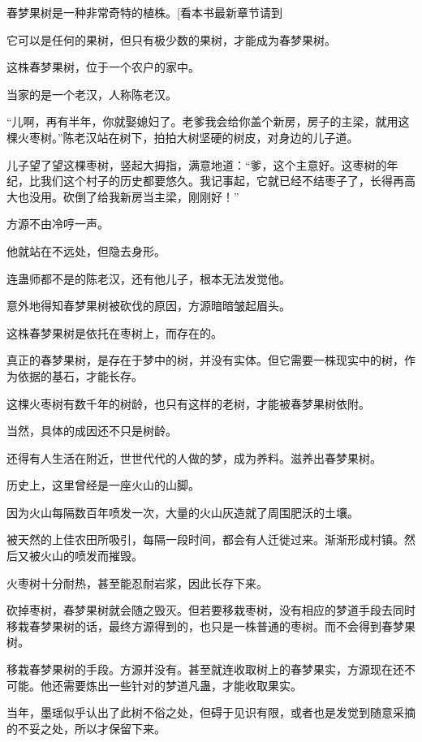 
\begin{this_body}

春梦果树是一种非常奇特的植株。[看本书最新章节请到

它可以是任何的果树，但只有极少数的果树，才能成为春梦果树。

这株春梦果树，位于一个农户的家中。

当家的是一个老汉，人称陈老汉。

“儿啊，再有半年，你就娶媳妇了。老爹我会给你盖个新房，房子的主梁，就用这棵火枣树。”陈老汉站在树下，拍拍大树坚硬的树皮，对身边的儿子道。

儿子望了望这棵枣树，竖起大拇指，满意地道：“爹，这个主意好。这枣树的年纪，比我们这个村子的历史都要悠久。我记事起，它就已经不结枣子了，长得再高大也没用。砍倒了给我新房当主梁，刚刚好！”

方源不由冷哼一声。

他就站在不远处，但隐去身形。

连蛊师都不是的陈老汉，还有他儿子，根本无法发觉他。

意外地得知春梦果树被砍伐的原因，方源暗暗皱起眉头。

这株春梦果树是依托在枣树上，而存在的。

真正的春梦果树，是存在于梦中的树，并没有实体。但它需要一株现实中的树，作为依据的基石，才能长存。

这棵火枣树有数千年的树龄，也只有这样的老树，才能被春梦果树依附。

当然，具体的成因还不只是树龄。

还得有人生活在附近，世世代代的人做的梦，成为养料。滋养出春梦果树。

历史上，这里曾经是一座火山的山脚。

因为火山每隔数百年喷发一次，大量的火山灰造就了周围肥沃的土壤。

被天然的上佳农田所吸引，每隔一段时间，都会有人迁徙过来。渐渐形成村镇。然后又被火山的喷发而摧毁。

火枣树十分耐热，甚至能忍耐岩浆，因此长存下来。

砍掉枣树，春梦果树就会随之毁灭。但若要移栽枣树，没有相应的梦道手段去同时移栽春梦果树的话，最终方源得到的，也只是一株普通的枣树。而不会得到春梦果树。

移栽春梦果树的手段。方源并没有。甚至就连收取树上的春梦果实，方源现在还不可能。他还需要炼出一些针对的梦道凡蛊，才能收取果实。

当年，墨瑶似乎认出了此树不俗之处，但碍于见识有限，或者也是发觉到随意采摘的不妥之处，所以才保留下来。


\end{this_body}

